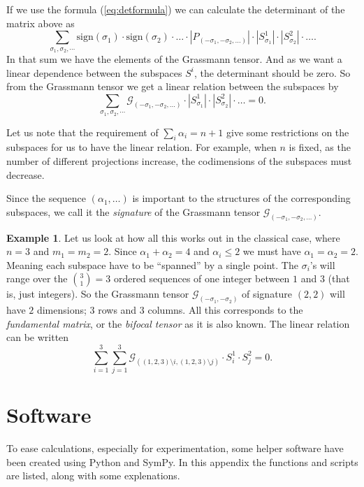 \documentclass[a4paper,12pt]{book}
\theoremstyle{plain}
\theoremstyle{definition}
\newtheorem{Example}[equation]{Example}
\begin{document}
If we use the formula (\ref{eq:detformula}) we can calculate the determinant of
the matrix above as
\[
	\sum_{\sigma_1, \sigma_2, \cdots} \text{sign}(\sigma_1) \cdot \text{sign}(\sigma_2)
	\cdot \ldots \cdot |P_{(-\sigma_1, -\sigma_2, \ldots )} | \cdot
	|S_{\sigma_1}^1| \cdot |S_{\sigma_2}^2| \cdot \ldots .
\]
In that sum we have the elements of the Grassmann tensor. And as we want a linear dependence
between the subspaces \( S^i \), the determinant should be zero. So from the Grassmann tensor
we get a linear relation between the subspaces by
\[
	\sum_{\sigma_1, \sigma_2, \cdots} \mathcal{G}_{(-\sigma_1, -\sigma_2,\ldots)}
	\cdot |S_{\sigma_1}^1| \cdot |S_{\sigma_2}^2| \cdot \ldots = 0.
\]

Let us note that the requirement of \( \sum_i \alpha_i = n + 1 \) give some restrictions on
the subspaces for us to have the linear relation. For example, when \( n \) is fixed, as the
number of different projections increase, the codimensions of the subspaces must decrease.

Since the sequence \( (\alpha_1, \ldots ) \) is important to the structures of the corresponding
subspaces, we call it the \emph{signature} of the Grassmann tensor
\( \mathcal{G}_{(-\sigma_1, -\sigma_2,\ldots)} \).

\begin{Example}
	Let us look at how all this works out in the classical case, where \( n = 3 \) and
	\( m_1 = m_2 = 2 \). Since \( \alpha_1 + \alpha_2 = 4 \) and \( \alpha_i \leq 2 \) we must
	have \( \alpha_1 = \alpha_2 = 2 \). Meaning each subspace have to be ``spanned'' by a single
	point. The \( \sigma_i \)'s will range over the \( {3 \choose 1} = 3\) ordered sequences of
	one integer between \( 1 \) and \( 3 \) (that is, just integers). So the Grassmann tensor
	\( \mathcal{G}_{(-\sigma_1, -\sigma_2)} \) of signature \( (2,2) \) will have \( 2 \)
	dimensions; \( 3 \) rows and \( 3 \) columns. All this corresponds to the
	\emph{fundamental matrix}, or the \emph{bifocal tensor} as it is also known.
	The linear relation can be written
	\[
		\sum_{i=1}^3 \sum_{j=1}^3
		\mathcal{G}_{((1,2,3) \setminus i,(1,2,3) \setminus j)}
		\cdot S_i^1 \cdot S_j^2 = 0.
	\]
\end{Example}


\appendix
\chapter{Software}
To ease calculations, especially for experimentation, some helper software have been created using
Python and SymPy. In this appendix the functions and scripts are listed, along with some explenations.




\end{document}

